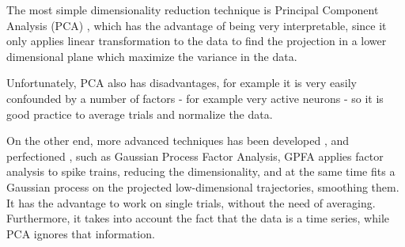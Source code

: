 The most simple dimensionality reduction technique is Principal Component Analysis (PCA) , which has the advantage of being very interpretable, since it only applies linear transformation to the data to find the projection in a lower dimensional plane which maximize the variance in the data.

Unfortunately, PCA also has disadvantages, for example it is very easily confounded by a number of factors - for example very active neurons - so it is good practice to average trials and normalize the data.

On the other end, more advanced techniques has been developed \cite{byron2009gaussian}, and perfectioned \cite{luttinen2009variational}, such as Gaussian Process Factor Analysis, 
GPFA applies factor analysis to spike trains, reducing the dimensionality, and at the same time fits a Gaussian process on the projected low-dimensional trajectories, smoothing them.
It has the advantage to work on single trials, without the need of averaging. Furthermore, it takes into account the fact that the data is a time series, while PCA ignores that information.



